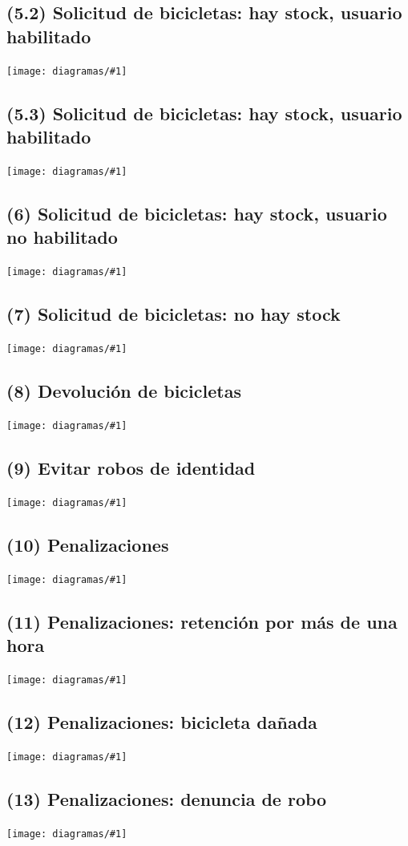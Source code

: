 \documentclass[a4paper, 10pt, twoside]{article}
\newcommand{\diagramav}[1]{
  \texttt{[image: diagramas/\#1]}
}
\begin{document}
\subsection{(5.2)  Solicitud de bicicletas: hay stock, usuario habilitado}
\diagramav{objetivos-5.2}

\subsection{(5.3)  Solicitud de bicicletas: hay stock, usuario habilitado}
\diagramav{objetivos-5.3}

\subsection{(6)    Solicitud de bicicletas: hay stock, usuario no habilitado}
\diagramav{objetivos-6}

\subsection{(7)    Solicitud de bicicletas: no hay stock}
\diagramav{objetivos-7}

\subsection{(8)    Devolución de bicicletas}
\diagramav{objetivos-8}

\subsection{(9)    Evitar robos de identidad}
\diagramav{objetivos-9}

\subsection{(10)   Penalizaciones}
\diagramav{objetivos-10}

\subsection{(11)   Penalizaciones: retención por más de una hora}
\diagramav{objetivos-11}

\subsection{(12)   Penalizaciones: bicicleta dañada}
\diagramav{objetivos-12}

\subsection{(13)   Penalizaciones: denuncia de robo}
\diagramav{objetivos-13}
\end{document}
